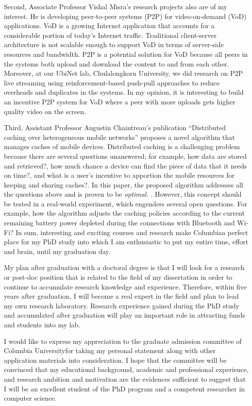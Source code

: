 \documentclass[a4paper,10pt]{report}
\newcommand{\university}{Columbia University}
\newcommand{\uniabbre}{Columbia}
\begin{document}
\vspace{0.2cm}
Second, Associate Professor Vishal Misra's research projects also are of my interest. He is developing peer-to-peer systems (P2P) for video-on-demand (VoD) applications. VoD is a growing Internet application that accounts for a considerable portion of today's Internet traffic. Traditional client-server architecture is not scalable enough to support VoD in terms of server-side resources and bandwidth. P2P is a potential solution for VoD because all peers in the systems both upload and download the content to and from each other. Moreover, at our UbiNet lab, Chulalongkorn University, we did research on P2P live streaming using reinforcement-based push-pull approaches to reduce overheads and duplicates in the systems. In my opinion, it is interesting to build an incentive P2P system for VoD where a peer with more uploads gets higher quality video on the screen.

\vspace{0.2cm}
Third, Assistant Professor Augustin Chaintreau's publication ``Distributed caching over heterogeneous mobile networks'' proposes a novel algorithm that manages caches of mobile devices. Distributed caching is a challenging problem because there are several questions unanswered; for example, how data are stored and retrieved?, how much chance a device can find the piece of data that it needs on time?, and what is a user's incentive to apportion the mobile resources for keeping and sharing caches?. In this paper, the proposed algorithm addresses all the questions above and is proven to be \textit{optimal. }. However, this concept should be tested in a real-world experiment, which engenders several open questions. For example, how the algorithm adjusts the caching policies according to the current remaining battery power depleted during the connections with Bluetooth and Wi-Fi? In sum, interesting and exciting courses and research make \uniabbre \space a perfect place for my PhD study into which I am enthusiastic to put my entire time, effort and brain, until my graduation day.

\vspace{0.2cm}
My plan after graduation with a doctoral degree is that I will look for a research or post-doc position that is related to the field of my dissertation in order to continue to accumulate research knowledge and experience. Therefore, within five years after graduation, I will become a real expert in the field and plan to lead my own research laboratory. Research experience gained during the PhD study and accumulated after graduation will play an important role in attracting funds and students into my lab.

\vspace{0.2cm}
I would like to express my appreciation to the graduate admission committee of \university \space for taking my personal statement along with other application materials into consideration. I hope that the committee will be convinced that my educational background, academic and professional experience, and research ambition and motivation are the evidences sufficient to suggest that I will be an excellent student of the PhD program and a competent researcher in computer science.
\end{document}
